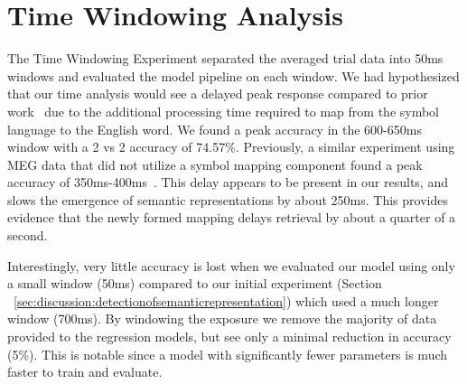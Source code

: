 \section{Time Windowing Analysis}
The Time Windowing Experiment separated the averaged trial data into 50ms 
windows and evaluated the model pipeline on each window. We had hypothesized 
that our time analysis would see a delayed peak response compared to prior 
work~\cite{Sudre2012} due to the additional processing time required to map 
from the symbol language to the English word. We found a peak accuracy in the 
600-650ms window with a 2 vs 2 accuracy of 74.57\%. Previously, a similar 
experiment using MEG data that did not utilize a symbol mapping component found 
a peak accuracy of 350ms-400ms~\cite{Sudre2012}. This delay appears to be 
present in our results, and slows the emergence of semantic representations by 
about 250ms. This provides evidence that the newly formed mapping delays 
retrieval by about a quarter of a second.

Interestingly, very little \tvt accuracy is lost when we evaluated our model 
using only a small window (50ms) compared to our initial experiment (Section 
~\ref{sec:discussion:detectionofsemanticrepresentation}) which used a much 
longer window (700ms). By windowing the exposure we remove the majority of data 
provided to the regression models, but see only a minimal reduction in accuracy 
(5\%). This is notable since a model with significantly fewer parameters is 
much faster to train and evaluate.

